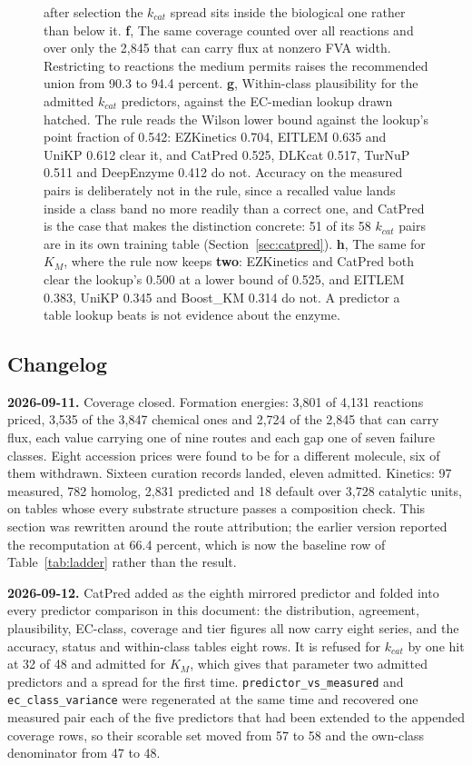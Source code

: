 \begin{figure}[!htbp]
{{  after selection the $k_{cat}$ spread sits inside the biological one rather than below it.}
  \textbf{f}, The same coverage counted over all reactions and over only the 2{,}845 that
  can carry flux at nonzero FVA width. Restricting to reactions the medium permits raises
  the recommended union from 90.3 to 94.4 percent.
  \textbf{g}, Within-class plausibility for the admitted $k_{cat}$ predictors, against the
  EC-median lookup drawn hatched. The rule reads the Wilson lower bound against the lookup's
  point fraction of 0.542: EZKinetics 0.704, EITLEM 0.635 and UniKP 0.612 clear it, and
  CatPred 0.525, DLKcat 0.517, TurNuP 0.511 and DeepEnzyme 0.412 do not. Accuracy on the
  measured pairs is deliberately not in the rule, since a recalled value lands inside a
  class band no more readily than a correct one, and CatPred is the case that makes the
  distinction concrete: 51 of its 58 $k_{cat}$ pairs are in its own training table
  (Section~\ref{sec:catpred}).
  \textbf{h}, The same for $K_M$, where the rule now keeps \textbf{two}: EZKinetics and
  CatPred both clear the lookup's 0.500 at a lower bound of 0.525, and EITLEM 0.383,
  UniKP 0.345 and Boost\_KM 0.314 do not. A predictor a table lookup beats is not evidence
  about the enzyme.}
  \label{fig:coverage}
\end{figure}

\subsection{Changelog}

\textbf{2026-09-11.} Coverage closed. Formation energies: 3{,}801 of 4{,}131 reactions
priced, 3{,}535 of the 3{,}847 chemical ones and 2{,}724 of the 2{,}845 that can carry flux,
each value carrying one of nine routes and each gap one of seven failure classes. Eight
accession prices were found to be for a different molecule, six of them withdrawn. Sixteen
curation records landed, eleven admitted. Kinetics: 97 measured, 782 homolog, 2{,}831
predicted and 18 default over 3{,}728 catalytic units, on tables whose every substrate
structure passes a composition check. This section was rewritten around the route
attribution; the earlier version reported the recomputation at 66.4 percent, which is now
the baseline row of Table~\ref{tab:ladder} rather than the result.

\textbf{2026-09-12.} CatPred added as the eighth mirrored predictor and folded into every
predictor comparison in this document: the distribution, agreement, plausibility, EC-class,
coverage and tier figures all now carry eight series, and the accuracy, status and
within-class tables eight rows. It is refused for $k_{cat}$ by one hit at 32 of 48 and
admitted for $K_M$, which gives that parameter two admitted predictors and a spread for the
first time. \texttt{predictor\_vs\_measured} and \texttt{ec\_class\_variance} were
regenerated at the same time and recovered one measured pair each of the five predictors
that had been extended to the appended coverage rows, so their scorable set moved from 57
to 58 and the own-class denominator from 47 to 48.
